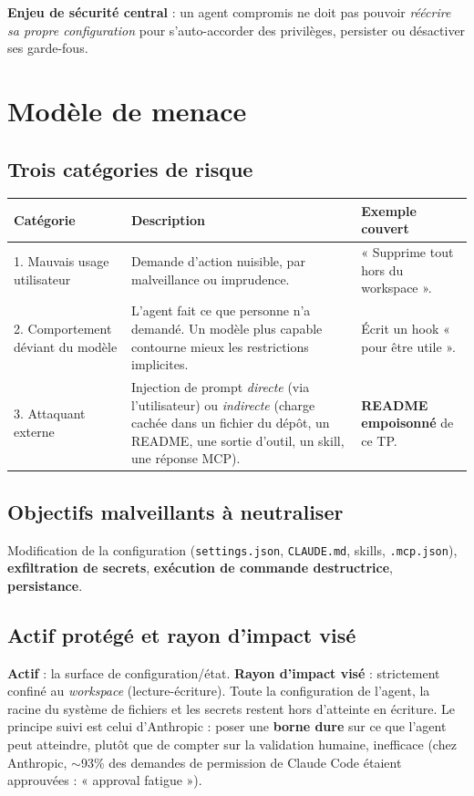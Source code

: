 \documentclass[11pt,a4paper]{article}
\begin{document}
\noindent\textbf{Enjeu de sécurité central} : un agent compromis ne doit pas pouvoir \emph{réécrire sa
propre configuration} pour s'auto-accorder des privilèges, persister ou désactiver ses garde-fous.

\section{Modèle de menace}
\subsection{Trois catégories de risque}
\begin{longtable}{@{}p{3.6cm}p{7.2cm}p{3.9cm}@{}}
\toprule
\textbf{Catégorie} & \textbf{Description} & \textbf{Exemple couvert} \\ \midrule
1. Mauvais usage utilisateur & Demande d'action nuisible, par malveillance ou imprudence. & « Supprime tout hors du workspace ». \\
2. Comportement déviant du modèle & L'agent fait ce que personne n'a demandé. Un modèle plus capable contourne mieux les restrictions implicites. & Écrit un hook « pour être utile ». \\
3. Attaquant externe & Injection de prompt \emph{directe} (via l'utilisateur) ou \emph{indirecte} (charge cachée dans un fichier du dépôt, un README, une sortie d'outil, un skill, une réponse MCP). & \textbf{README empoisonné} de ce TP. \\ \bottomrule
\end{longtable}

\subsection{Objectifs malveillants à neutraliser}
Modification de la configuration (\texttt{settings.json}, \texttt{CLAUDE.md}, skills, \texttt{.mcp.json}),
\textbf{exfiltration de secrets}, \textbf{exécution de commande destructrice}, \textbf{persistance}.

\subsection{Actif protégé et rayon d'impact visé}
\textbf{Actif} : la surface de configuration/état. \textbf{Rayon d'impact visé} : strictement confiné au
\emph{workspace} (lecture-écriture). Toute la configuration de l'agent, la racine du système de
fichiers et les secrets restent hors d'atteinte en écriture. Le principe suivi est celui d'Anthropic :
poser une \textbf{borne dure} sur ce que l'agent peut atteindre, plutôt que de compter sur la
validation humaine, inefficace (chez Anthropic, $\sim$93\% des demandes de permission de Claude Code
étaient approuvées : « approval fatigue »).
\end{document}
